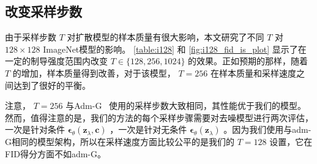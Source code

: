 \documentclass{article}
\newcommand{\bc}{\mathbf{c}}
\newcommand{\bz}{\mathbf{z}}
\newcommand{\bepsilon}{{\boldsymbol{\epsilon}}}
\begin{document}
 \subsection{
改变采样步数} 


由于采样步数 $T$ 对扩散模型的样本质量有很大影响，本文研究了不同 $T$ 对 $128\times128$ ImageNet模型的影响。 \cref{table:i128} 和 \cref{fig:i128_fid_is_plot} 显示了在一定的制导强度范围内改变 $T\in \{ 128,256,1024 \} $ 的效果。正如预期的那样，随着 $T$ 的增加，样本质量得到改善，对于该模型， $T=256$ 在样本质量和采样速度之间达到了很好的平衡。


注意， $T=256$ 与Adm-G~ \citep{dhariwal2021diffusion} 使用的采样步数大致相同，其性能优于我们的模型。然而，值得注意的是，我们的方法的每个采样步骤需要对去噪模型进行两次评估，一次是针对条件 $\bepsilon_\theta(\bz_\lambda,\bc)$ ，一次是针对无条件 $\bepsilon_\theta(\bz_\lambda)$ 。因为我们使用与adm-G相同的模型架构，所以在采样速度方面比较公平的是我们的 $T=128$ 设置，它在FID得分方面不如adm-G。
\end{document}

